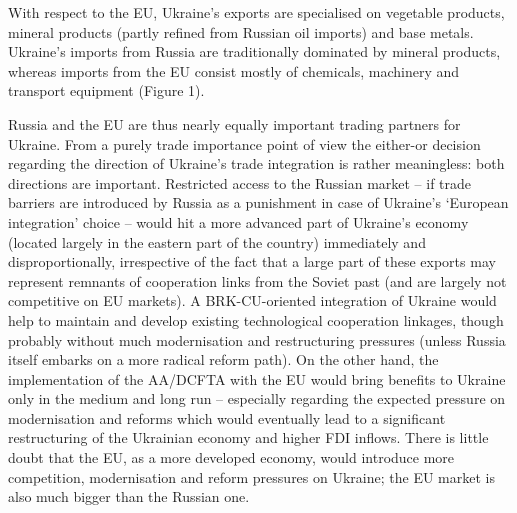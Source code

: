 With respect to the EU, Ukraine's exports are specialised on vegetable products, mineral products (partly refined from Russian oil imports) and base metals. Ukraine's imports from Russia are traditionally dominated by mineral products, whereas imports from the EU consist mostly of chemicals, machinery and transport equipment (Figure 1). 

Russia and the EU are thus nearly equally important trading partners for Ukraine. From a purely trade importance point of view the either-or decision regarding the direction of Ukraine's trade integration is rather meaningless: both directions are important. Restricted access to the Russian market -- if trade barriers are introduced by Russia as a punishment in case of Ukraine's `European integration' choice -- would hit a more advanced part of Ukraine's economy (located largely in the eastern part of the country) immediately and disproportionally, irrespective of the fact that a large part of these exports may represent remnants of cooperation links from the Soviet past (and are largely not competitive on EU markets). A BRK-CU-oriented integration of Ukraine would help to maintain and develop existing technological cooperation linkages, though probably without much modernisation and restructuring pressures (unless Russia itself embarks on a more radical reform path). On the other hand, the implementation of the AA/DCFTA with the EU would bring benefits to Ukraine only in the medium and long run -- especially regarding the expected pressure on modernisation and reforms which would eventually lead to a significant restructuring of the Ukrainian economy and higher FDI inflows. There is little doubt that the EU, as a more developed economy, would introduce more competition, modernisation and reform pressures on Ukraine; the EU market is also much bigger than the Russian one. 

\vspace*{2mm}

